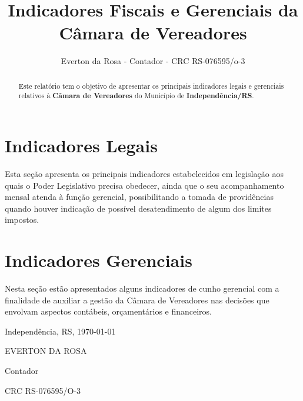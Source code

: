 \documentclass[12pt, a4paper]{article}
\title{Indicadores Fiscais e Gerenciais da Câmara de Vereadores}
\author{Everton da Rosa - Contador - CRC RS-076595/o-3}
\begin{document}
\maketitle

\begin{abstract}
Este relatório tem o objetivo de apresentar os principais indicadores legais e gerenciais relativos à \textbf{Câmara de Vereadores} do Município de \textbf{Independência/RS}.
\end{abstract}

\tableofcontents

\section{Indicadores Legais}

Esta seção apresenta os principais indicadores estabelecidos em legislação aos quais o Poder Legislativo precisa obedecer, ainda que o seu acompanhamento mensal atenda à função gerencial, possibilitando a tomada de providências quando houver indicação de possível desatendimento de algum dos limites impostos.







\section{Indicadores Gerenciais}

Nesta seção estão apresentados alguns indicadores de cunho gerencial com a finalidade de auxiliar a gestão da Câmara de Vereadores nas decisões que envolvam aspectos contábeis, orçamentários e financeiros.




\bigskip

\centering

Independência, RS, \today

\bigskip
\bigskip
\bigskip

EVERTON DA ROSA

Contador

CRC RS-076595/O-3
\end{document}
